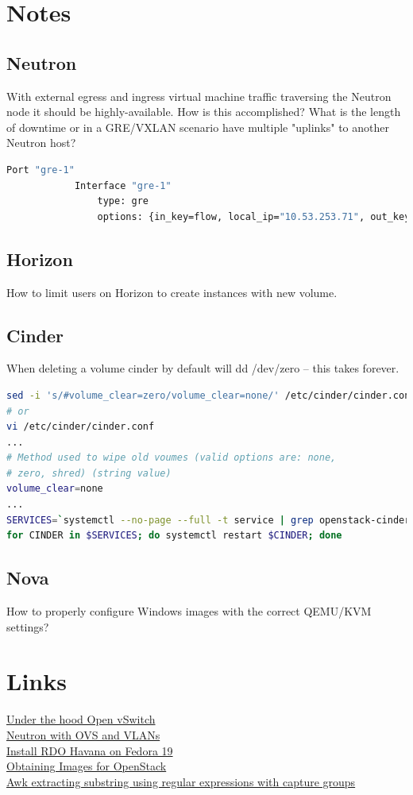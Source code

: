 \documentclass[11pt,letterpaper,oneside]{book}
\begin{document}
\chapter{Notes}
\section{Neutron}
With external egress and ingress virtual machine traffic traversing the Neutron node it should be highly-available.  How is this accomplished?  What is the length of downtime or in a GRE/VXLAN scenario have multiple "uplinks" to another Neutron host? 
\begin{lstlisting}[language=bash]
Port "gre-1"
            Interface "gre-1"
                type: gre
                options: {in_key=flow, local_ip="10.53.253.71", out_key=flow, remote_ip="10.53.253.101"}
\end{lstlisting}
\section{Horizon}
How to limit users on Horizon to create instances with new volume.
\section{Cinder}
When deleting a volume cinder by default will dd /dev/zero – this takes forever.
\begin{lstlisting}[caption={Change Cinder volume clear},language=bash]
sed -i 's/#volume_clear=zero/volume_clear=none/' /etc/cinder/cinder.conf
# or
vi /etc/cinder/cinder.conf
...
# Method used to wipe old voumes (valid options are: none, 
# zero, shred) (string value) 
volume_clear=none
...
SERVICES=`systemctl --no-page --full -t service | grep openstack-cinder | awk '{print $1}'` 
for CINDER in $SERVICES; do systemctl restart $CINDER; done
\end{lstlisting}
\section{Nova}
How to properly configure Windows images with the correct QEMU/KVM settings?
\chapter{Links}
\href{http://docs.openstack.org/grizzly/openstack-network/admin/content//under_the_hood_openvswitch.html}{Under the hood Open vSwitch}\\
\href{http://openstack.redhat.com/Neutron\_with\_OVS\_and\_VLANs}{Neutron with OVS and VLANs}\\
\href{http://www.blog.sandro-mathys.ch/2013/08/install-rdo-havana-2-on-fedora-19-and.html}{Install RDO Havana on Fedora 19}\\
\href{http://docs.openstack.org/image-guide/content/ch\_obtaining\_images.html}{Obtaining Images for OpenStack}\\
\href{http://www.markhneedham.com/blog/2013/06/26/unixawk-extracting-substring-using-a-regular-expression-with-capture-groups/}{Awk extracting substring using regular expressions with capture groups}\\
\end{document}
